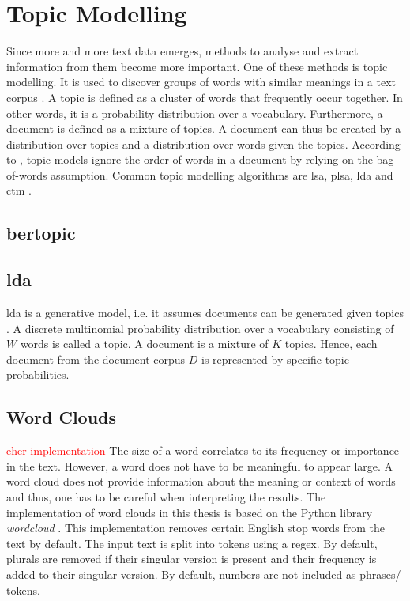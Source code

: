 \section{Topic Modelling}\label{sec:topic-modelling}

Since more and more text data emerges, methods to analyse and extract information from them become more important.
One of these methods is topic modelling.
It is used to discover groups of words with similar meanings in a text corpus \cite{topic_modeling2015}.
A topic is defined as a cluster of words that frequently occur together.
In other words, it is a probability distribution over a vocabulary.
Furthermore, a document is defined as a mixture of topics.
A document can thus be created by a distribution over topics and a distribution over words given the topics.
According to \citeauthor{topic_modeling2015}, topic models ignore the order of words in a document by relying on the bag-of-words assumption.
Common topic modelling algorithms are \ac{lsa}, \ac{plsa}, \ac{lda} and \ac{ctm} \cite{topic_modeling2015}.




\subsection{\ac{bertopic}}\label{subsec:bertopic}

\subsection{\ac{lda}}\label{subsec:latent-dirichlet-allocation}

\ac{lda} is a generative model, i.e. it assumes documents can be generated given topics \cite{topic_modeling2015}.
A discrete multinomial probability distribution over a vocabulary consisting of $W$ words is called a topic.
A document is a mixture of $K$ topics.
Hence, each document from the document corpus $D$ is represented by specific topic probabilities.

\cite{clusteringDocs2020}

\subsection{Word Clouds}\label{subsec:word-clouds}

\textcolor{red}{eher implementation}
The size of a word correlates to its frequency or importance in the text.
However, a word does not have to be meaningful to appear large.
A word cloud does not provide information about the meaning or context of words and thus, 
one has to be careful when interpreting the results.
The implementation of word clouds in this thesis is based on the Python library \textit{wordcloud} \cite{wordcloud-dev}.
This implementation removes certain English stop words from the text by default.
The input text is split into tokens using a regex.
By default, plurals are removed if their singular version is present and their frequency is added to their singular version.
By default, numbers are not included as phrases/ tokens.